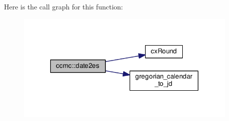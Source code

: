 Here is the call graph for this function\-:
\nopagebreak
\begin{figure}[H]
\begin{center}
\leavevmode
\includegraphics[width=304pt]{namespaceccmc_a2bcda52133fe790c98ff1e09e0d8feef_cgraph}
\end{center}
\end{figure}


